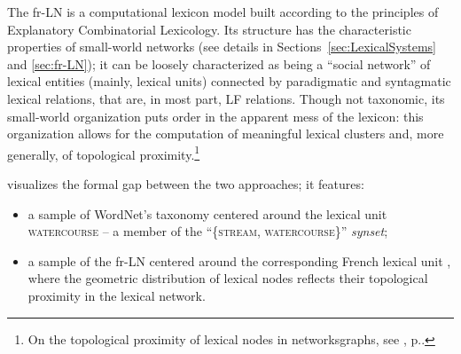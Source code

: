 The fr-LN \parencite{LuxPogodallaPolguere2011} is a computational lexicon model built according to the principles of Explanatory Combinatorial Lexicology. Its structure has the characteristic properties of small-world networks (see details in Sections~\ref{sec:LexicalSystems} and \ref{sec:fr-LN}); it can be loosely characterized as being a ``social network'' of lexical entities (mainly, lexical units) connected by paradigmatic and syntagmatic lexical relations, that are, in most part, LF relations. Though not taxonomic, its small-world organization puts order in the apparent mess of the lexicon: this organization allows for the computation of meaningful lexical clusters and, more generally, of topological proximity.\footnote{On the topological proximity of lexical nodes in networks\slashs{}graphs, see , p.\thinspace\pageref{sec:lexicalProximityTopologicalProximity}.}

 visualizes the formal gap between the two approaches; it features:

\begin{itemize}
\item a sample of WordNet's taxonomy centered around the lexical unit \textsc{watercourse} -- a member of the ``\{\thinspace\textsc{stream}, \textsc{watercourse}\thinspace\}'' \textit{synset};
\item a sample of the fr-LN centered around the corresponding French lexical unit , where the geometric distribution of lexical nodes reflects their topological proximity in the lexical network.
\end{itemize}

